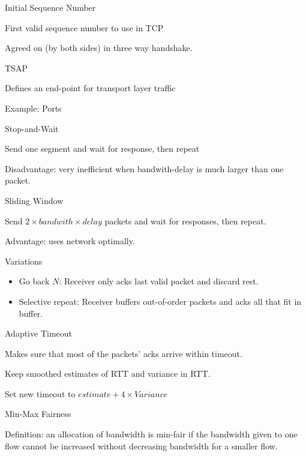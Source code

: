 \documentclass[main.tex]{subfiles}
\begin{document}
\begin{card}[ISN]{Initial Sequence Number}
\item First valid sequence number to use in TCP
\item Agreed on (by both sides) in three way handshake.
\end{card}

\begin{card}{TSAP}
\item Defines an end-point for transport layer traffic
\item Example: Ports
\end{card}

\begin{card}{Stop-and-Wait}
\item Send one segment and wait for response, then repeat
\item Disadvantage: very inefficient when bandwith-delay is much larger than one packet.
\end{card}

\begin{card}{Sliding Window}
\item Send $2\times bandwith \times delay$ packets and wait for responses, then repeat.
\item Advantage: uses network optimally.
\item Variations
    \begin{itemize}
        \item Go back $N$: Receiver only acks last valid packet and discard rest.
        \item Selective repeat: Receiver buffers out-of-order packets and acks all that fit in buffer.
    \end{itemize}
\end{card}

\begin{card}{Adaptive Timeout}
\item Makes sure that most of the packets' acks arrive within timeout.
\item Keep smoothed estimates of RTT and variance in RTT.
\item Set new timeout to $estimate + 4\times Variance$
\end{card}

\begin{card}{Min-Max Fairness}
\item Definition: an allocation of bandwidth is min-fair if the bandwidth given to one flow cannot be increased without decreasing bandwidth for a smaller flow.
\end{card}
\end{document}
